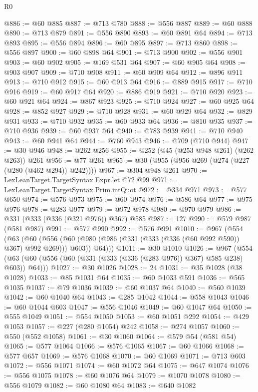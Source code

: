 \begin{lexlean}{R0}
\begin{coremodule}
@886 := @60 @885
@887 := @713 @780
@888 := @556 @887
@889 := @60 @888
@890 := @713 @879
@891 := @556 @890
@893 := @60 @891 @64
@894 := @713 @893
@895 := @556 @894
@896 := @60 @895
@897 := @713 @860
@898 := @556 @897
@900 := @60 @898 @64
@901 := @713 @900
@902 := @556 @901
@903 := @60 @902
@905 := @169 @531 @64
@907 := @60 @905 @64
@908 := @903 @907
@909 := @710 @908
@911 := @60 @909 @64
@912 := @896 @911
@913 := @710 @912
@915 := @60 @913 @64
@916 := @889 @915
@917 := @710 @916
@919 := @60 @917 @64
@920 := @886 @919
@921 := @710 @920
@923 := @60 @921 @64
@924 := @867 @923
@925 := @710 @924
@927 := @60 @925 @64
@928 := @852 @927
@929 := @710 @928
@931 := @60 @929 @64
@932 := @829 @931
@933 := @710 @932
@935 := @60 @933 @64
@936 := @810 @935
@937 := @710 @936
@939 := @60 @937 @64
@940 := @783 @939
@941 := @710 @940
@943 := @60 @941 @64
@944 := @760 @943
@946 := @709 (@710 @944)
@947 := @30 @946
@948 := @262 @256
@955 := @252 (@45 (@253 @948 @261) (@262 @263)) @261
@956 := @77 @261
@965 := @30 (@955 (@956 @269 (@274 (@227 (@280 (@462 @294)) @242))))
@967 := @304 @948 @261
@970 := LexLeanTarget.TargetSyntax.Expr.let @72 @99
@971 := LexLeanTarget.TargetSyntax.Prim.intQuot
@972 := @334 @971
@973 := @577 @650
@974 := @576 @973
@975 := @60 @974
@976 := @586 @64
@977 := @975 @976
@978 := @283 @977
@979 := @972 @978
@980 := @970 @979
@986 := @331 (@333 (@336 (@321 @976)) @367) @585
@987 := 127
@990 := @579 @987 (@581 @987)
@991 := @577 @990
@992 := @576 @991
@1010 := @967
    (@554
      (@63
        (@60
          (@556 (@60 (@980 (@986 (@331 (@333 (@336 (@60 @992 @590)) @367) @992 @269))) @603))
          @64)))
@1011 := @30 @1010
@1026 := @967
    (@554 (@63 (@60 (@556 (@60 (@331 (@333 (@336 (@283 @976)) @367) @585 @238) @603)) @64)))
@1027 := @30 @1026
@1028 := 24
@1031 := @35 @1028 (@38 @1028)
@1033 := @85 @1031 @64
@1035 := @60 @1033 @591
@1036 := @565 @1035
@1037 := @79 @1036
@1039 := @60 @1037 @64
@1040 := @560 @1039
@1042 := @60 @1040 @64
@1043 := @285 @1042
@1044 := @558 @1043
@1046 := @60 @1044 @603
@1047 := @556 @1046
@1049 := @60 @1047 @64
@1050 := @555 @1049
@1051 := @554 @1050
@1053 := @60 @1051 @292
@1054 := @429 @1053
@1057 := @227 (@280 @1054) @242
@1058 := @274 @1057
@1060 := @550 (@552 @1058)
@1061 := @30 @1060
@1064 := @579 @54 (@581 @54)
@1065 := @577 @1064
@1066 := @576 @1065
@1067 := @60 @1066
@1068 := @577 @657
@1069 := @576 @1068
@1070 := @60 @1069
@1071 := @713 @603
@1072 := @556 @1071
@1074 := @60 @1072 @64
@1075 := @647 @1074
@1076 := @556 @1075
@1078 := @60 @1076 @64
@1079 := @1070 @1078
@1080 := @556 @1079
@1082 := @60 @1080 @64
@1083 := @640 @1082

\end{coremodule}
\end{lexlean}
